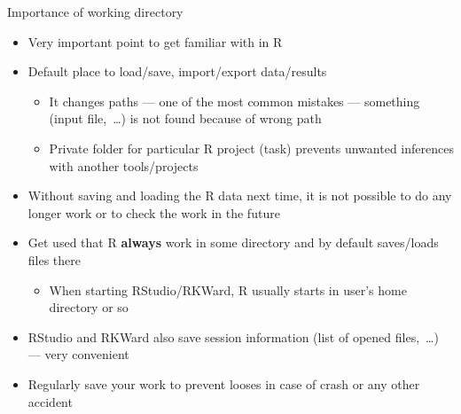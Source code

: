 \documentclass[compress, ucs, xelatex, 11pt, xcolor=svgnames, aspectratio=169,
	hyperref={
		bookmarks=true,
		unicode=true,
		colorlinks=true,
		pdftitle={Molecular data in R},
		plainpages=false,
		pdfauthor={Vojtech Zeisek},
		pdfsubject={Course about phylogeny and evolution in R},
		pdfcreator={XeLaTeX},
		pdfkeywords={R, evolution, phylogeny, molecular data},
		linkcolor=Crimson, %
		anchorcolor=Magenta, %
		citecolor=Magenta, %
		filecolor=Magenta, %
		menucolor=Magenta, %
		urlcolor=DodgerBlue, %
		pdftex},
	url={hyphens, lowtilde} %
	]{beamer}
\begin{document}
\begin{frame}{Importance of working directory}
	\begin{itemize}
	 \item Very important point to get familiar with in R
		\item Default place to load/save, import/export data/results
		\begin{itemize}
			\item It changes paths --- one of the most common mistakes --- something (input file,~\ldots) is not found because of wrong path
			\item Private folder for particular R project (task) prevents unwanted inferences with another tools/projects
		\end{itemize}
		\item Without saving and loading the R data next time, it is not possible to do any longer work or to check the work in the future
		\item \alert{Get used that R \textbf{always} work in some directory and by default saves/loads files there}
		\begin{itemize}
		 \item When starting RStudio/RKWard, R usually starts in user's home directory or so
		\end{itemize}
		\item RStudio and RKWard also save session information (list of opened files,~\ldots) --- very convenient
		\item Regularly save your work to prevent looses in case of crash or any other accident
	\end{itemize}
\end{frame}
\end{document}
